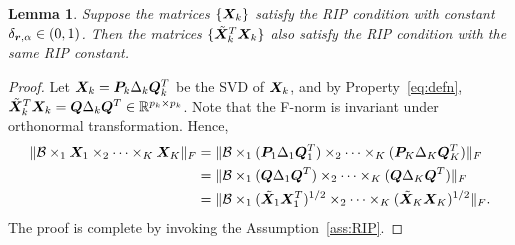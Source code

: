 \documentclass[11pt]{article}
\theoremstyle{plain}
\newtheorem{lem}{Lemma}
\theoremstyle{definition}
\begin{document}
\begin{lem}\label{lemma:RIP}
Suppose the matrices $\{\bm X_k\}$ satisfy the RIP condition with constant $\delta_{\bm{r},\alpha}\in(0,1)$. Then the matrices $\{ \tilde {\bm X}^T_k\bm X_k \}$ also satisfy the RIP condition with the same RIP constant. 
\end{lem}
\begin{proof}
Let $\bm X_k=\bm{P}_k\Delta_k \bm{Q}^T_k$ be the SVD of $\bm X_k$, and by Property~\ref{eq:defn}, $\tilde{\bm X}^T_k\bm X_k=\bm{Q}\Delta_k\bm{Q}^T\in\mathbb{R}^{p_k\times p_k}$. Note that the F-norm is invariant under orthonormal transformation. Hence,
\begin{align}
\lVert\mathcal{B}\times_1\bm X_1\times_2\cdots\times_K\bm X_K\rVert_F&=\lVert\mathcal{B}\times_1(\bm{P}_1\Delta_1\bm{Q}^T_1)\times_2\cdots\times_K(\bm{P}_K\Delta_K\bm{Q}^T_K)\rVert_F\\
&=\lVert\mathcal{B}\times_1 (\bm{Q}\Delta_1\bm{Q}^T)\times_2\cdots\times_K(\bm{Q}\Delta_K\bm{Q}^T)\rVert_F\\
&=\lVert\mathcal{B}\times_1 (\tilde {\bm X}_1\bm X^T_1)^{1/2}\times_2\cdots\times_K (\tilde {\bm X}_K\bm X_K)^{1/2} \rVert_F.
\end{align}
The proof is complete by invoking the Assumption~\ref{ass:RIP}.
\end{proof}
\end{document}
